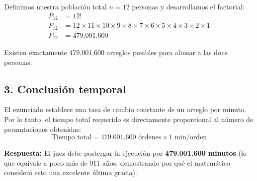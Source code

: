 \documentclass[12pt, a4paper]{article}
\begin{document}
Definimos nuestra población total $n = 12$ personas y desarrollamos el factorial:
\begin{align*}
P_{12} &= 12! \\
P_{12} &= 12 \times 11 \times 10 \times 9 \times 8 \times 7 \times 6 \times 5 \times 4 \times 3 \times 2 \times 1 \\
P_{12} &= 479.001.600
\end{align*}

Existen exactamente 479.001.600 arreglos posibles para alinear a las doce personas.

\subsection*{3. Conclusión temporal}
El enunciado establece una tasa de cambio constante de un arreglo por minuto. Por lo tanto, el tiempo total requerido es directamente proporcional al número de permutaciones obtenidas:
\[ \text{Tiempo total} = 479.001.600 \text{ órdenes} \times 1 \text{ min/orden} \]

\vspace{0.5cm}

\textbf{Respuesta:} El juez debe postergar la ejecución por \textbf{479.001.600 minutos} (lo que equivale a poco más de 911 años, demostrando por qué el matemático consideró esto una excelente última gracia).
\end{document}
